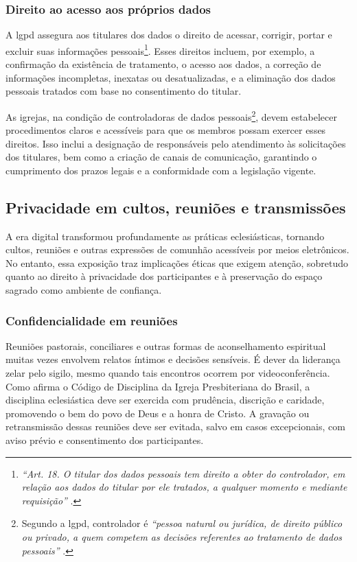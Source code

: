 \subsubsection{Direito ao acesso aos próprios dados}

A \gls{lgpd} assegura aos titulares dos dados o direito de acessar, corrigir, portar e excluir suas informações pessoais\footnote{\textit{``Art. 18. O titular dos dados pessoais tem direito a obter do controlador, em relação aos dados do titular por ele tratados, a qualquer momento e mediante requisição''} \cite[Cap.~III, art.~18]{lgpd2018}.}. Esses direitos incluem, por exemplo, a confirmação da existência de tratamento, o acesso aos dados, a correção de informações incompletas, inexatas ou desatualizadas, e a eliminação dos dados pessoais tratados com base no consentimento do titular.

As igrejas, na condição de controladoras de dados pessoais\footnote{Segundo a \gls{lgpd}, controlador é \textit{``pessoa natural ou jurídica, de direito público ou privado, a quem competem as decisões referentes ao tratamento de dados pessoais''} \cite[art.~5º, inciso~VI]{lgpd2018}.}, devem estabelecer procedimentos claros e acessíveis para que os membros possam exercer esses direitos. Isso inclui a designação de responsáveis pelo atendimento às solicitações dos titulares, bem como a criação de canais de comunicação, garantindo o cumprimento dos prazos legais e a conformidade com a legislação vigente.

\subsection{Privacidade em cultos, reuniões e transmissões}

A era digital transformou profundamente as práticas eclesiásticas, tornando cultos, reuniões e outras expressões de comunhão acessíveis por meios eletrônicos. No entanto, essa exposição traz implicações éticas que exigem atenção, sobretudo quanto ao direito à privacidade dos participantes e à preservação do espaço sagrado como ambiente de confiança.

\subsubsection{Confidencialidade em reuniões}

Reuniões pastorais, conciliares e outras formas de aconselhamento espiritual muitas vezes envolvem relatos íntimos e decisões sensíveis. É dever da liderança zelar pelo sigilo, mesmo quando tais encontros ocorrem por videoconferência. Como afirma o Código de Disciplina da Igreja Presbiteriana do Brasil, a disciplina eclesiástica deve ser exercida com prudência, discrição e caridade, promovendo o bem do povo de Deus e a honra de Cristo. A gravação ou retransmissão dessas reuniões deve ser evitada, salvo em casos excepcionais, com aviso prévio e consentimento dos participantes.

